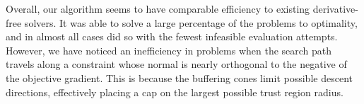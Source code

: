 Overall, our algorithm seems to have comparable efficiency to existing derivative-free solvers.
It was able to solve a large percentage of the problems to optimality, and in almost all cases did so with the fewest infeasible evaluation attempts.
However, we have noticed an inefficiency in problems when the search path travels along a constraint whose normal is nearly orthogonal to the negative of the objective gradient.
This is because the buffering cones limit possible descent directions, effectively placing a cap on the largest possible trust region radius.




% 
% 
% 
% 
% 
% 
% 
% 

